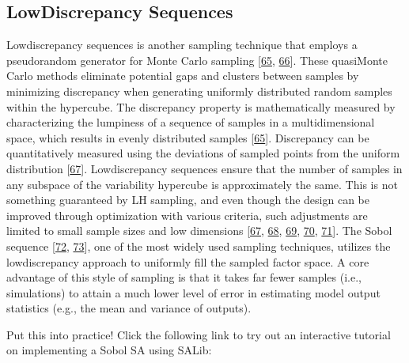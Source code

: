 \documentclass[letterpaper,10pt,english]{sphinxmanual}
\begin{document}
\subsection{Low\sphinxhyphen{}Discrepancy Sequences}
\label{\detokenize{3_sensitivity_analysis_the_basics:low-discrepancy-sequences}}
\sphinxAtStartPar
Low\sphinxhyphen{}discrepancy sequences is another sampling technique that employs a pseudo\sphinxhyphen{}random generator for Monte Carlo sampling {[}\hyperlink{cite.index:id81}{65}, \hyperlink{cite.index:id92}{66}{]}. These quasi\sphinxhyphen{}Monte Carlo methods eliminate potential gaps and clusters between samples by minimizing discrepancy when generating uniformly distributed random samples within the hypercube. The discrepancy property is mathematically measured by characterizing the lumpiness of a sequence of samples in a multidimensional space, which results in evenly distributed samples {[}\hyperlink{cite.index:id81}{65}{]}. Discrepancy can be quantitatively measured using the deviations of sampled points from the uniform distribution {[}\hyperlink{cite.index:id95}{67}{]}. Low\sphinxhyphen{}discrepancy sequences ensure that the number of samples in any subspace of the variability hypercube is approximately the same. This is not something guaranteed by LH sampling, and even though the design can be improved through optimization with various criteria, such adjustments are limited to small sample sizes and low dimensions {[}\hyperlink{cite.index:id95}{67}, \hyperlink{cite.index:id93}{68}, \hyperlink{cite.index:id94}{69}, \hyperlink{cite.index:id96}{70}, \hyperlink{cite.index:id97}{71}{]}. The Sobol sequence {[}\hyperlink{cite.index:id98}{72}, \hyperlink{cite.index:id99}{73}{]}, one of the most widely used sampling techniques, utilizes the low\sphinxhyphen{}discrepancy approach to uniformly fill the sampled factor space. A core advantage of this style of sampling is that it takes far fewer samples (i.e., simulations) to attain a much lower level of error in estimating model output statistics (e.g., the mean and variance of outputs).


\nopagebreak


\sphinxAtStartPar
Put this into practice! Click the following link to try out an interactive tutorial on implementing a Sobol SA using SALib:

\sphinxAtStartPar
{}
\end{document}
